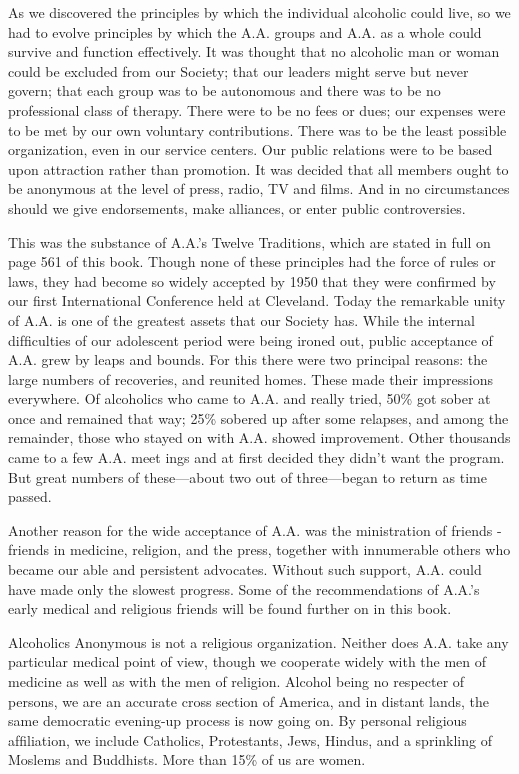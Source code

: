 As we discovered the principles by which the individual alcoholic could live, so we had to evolve principles by which the A.A. groups and A.A. as a whole could survive and function effectively. 
It was thought that no alcoholic man or woman could be excluded from our Society; 
that our leaders might serve but never govern; 
that each group was to be autonomous and there was to be no professional class of therapy.
There were to be no fees or dues; 
our expenses were to be met by our own voluntary contributions. 
There was to be the least possible organization, even in our service centers. 
Our public relations were to be based upon attraction rather than promotion. 
It was decided that all members ought to be anonymous at the level of press, radio, TV and films. 
And in no circumstances should we give endorsements, make alliances, or enter public controversies.

This was the substance of A.A.’s Twelve Traditions, which are stated in full on page 561 of this book.
Though none of these principles had the force of rules or laws, they had become so widely accepted by 1950 that they were conﬁrmed by our first International Conference held at Cleveland. 
Today the remarkable unity of A.A. is one of the greatest assets that our Society has.
While the internal difﬁculties of our adolescent
period were being ironed out, public acceptance of A.A. grew by leaps and bounds.
For this there were two principal reasons:
the large numbers of recoveries, and reunited homes.
These made their impressions everywhere.
Of alcoholics who came to A.A. and really tried, 50\% got sober at once and remained that way;
25\% sobered up after some relapses, and among the remainder, those who stayed on with A.A. showed improvement.
Other thousands came to a few A.A. meet ings and at first decided they didn’t want the program. 
But great numbers of these—about two out of three—began to return as time passed.

Another reason for the wide acceptance of A.A. was the ministration of friends - friends in medicine, religion, and the press, together with innumerable others who became our able and persistent advocates.
Without such support, A.A. could have made only the slowest progress.
Some of the recommendations of A.A.’s early medical and religious friends will be found further on in this book.

Alcoholics Anonymous is not a religious organization.
Neither does A.A. take any particular medical point of view, though we cooperate widely with the men of medicine as well as with the men of religion.
Alcohol being no respecter of persons, we are an accurate cross section of America, and in distant lands, the same democratic evening-up process is now going on. 
By personal religious afﬁliation, we include Catholics, Protestants, Jews, Hindus, and a sprinkling of Moslems and Buddhists. 
More than 15\% of us are women.

